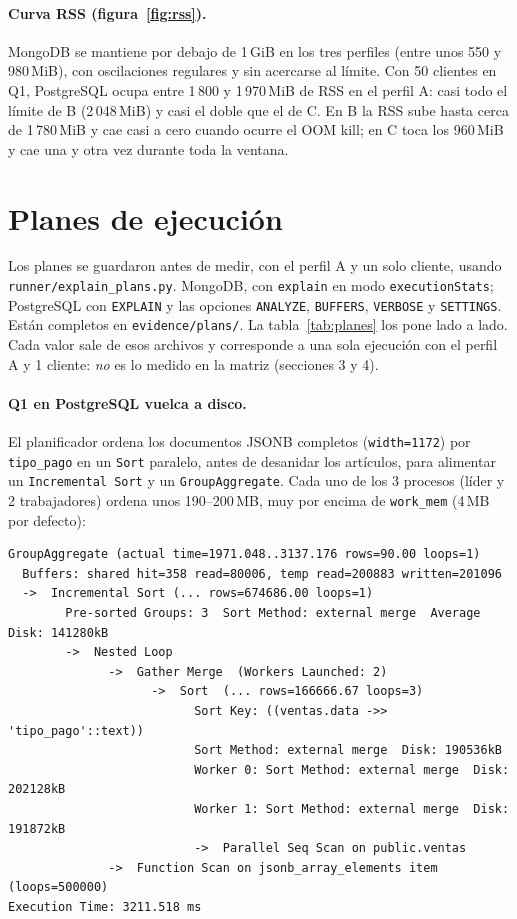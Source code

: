 \documentclass[11pt,a4paper]{article}
\newcommand{\cod}[1]{\texttt{#1}}
\begin{document}
\paragraph{Curva RSS (figura~\ref{fig:rss}).} MongoDB se mantiene por debajo de
1\,GiB en los tres perfiles (entre unos 550 y 980\,MiB), con oscilaciones regulares y sin
acercarse al límite. Con 50 clientes en Q1, PostgreSQL ocupa entre 1\,800 y 1\,970\,MiB
de RSS en el perfil A: casi todo el límite de B (2\,048\,MiB) y casi el doble que el de C. En B la RSS
sube hasta cerca de 1\,780\,MiB y cae casi a cero cuando ocurre el OOM kill; en C toca
los 960\,MiB y cae una y otra vez durante toda la ventana.

\section{Planes de ejecución}\label{sec:planes}
Los planes se guardaron antes de medir, con el perfil A y un solo cliente, usando
\cod{runner/explain\_plans.py}. MongoDB, con \cod{explain} en modo
\cod{executionStats}; PostgreSQL con \cod{EXPLAIN} y las opciones \cod{ANALYZE},
\cod{BUFFERS}, \cod{VERBOSE} y \cod{SETTINGS}.
Están completos en \cod{evidence/plans/}. La tabla~\ref{tab:planes} los pone lado a lado.
Cada valor sale de esos archivos y corresponde a una sola ejecución con el perfil A y 1
cliente: \emph{no} es lo medido en la matriz (secciones 3 y 4).



\paragraph{Q1 en PostgreSQL vuelca a disco.} El planificador ordena los documentos JSONB
completos (\cod{width=1172}) por \cod{tipo\_pago} en un \cod{Sort} paralelo, antes de
desanidar los artículos, para alimentar un \cod{Incremental Sort} y un
\cod{GroupAggregate}. Cada uno de los 3 procesos (líder y 2 trabajadores) ordena
unos 190--200\,MB, muy por encima de \cod{work\_mem} (4\,MB por defecto):

\begin{lstlisting}
GroupAggregate (actual time=1971.048..3137.176 rows=90.00 loops=1)
  Buffers: shared hit=358 read=80006, temp read=200883 written=201096
  ->  Incremental Sort (... rows=674686.00 loops=1)
        Pre-sorted Groups: 3  Sort Method: external merge  Average Disk: 141280kB
        ->  Nested Loop
              ->  Gather Merge  (Workers Launched: 2)
                    ->  Sort  (... rows=166666.67 loops=3)
                          Sort Key: ((ventas.data ->> 'tipo_pago'::text))
                          Sort Method: external merge  Disk: 190536kB
                          Worker 0: Sort Method: external merge  Disk: 202128kB
                          Worker 1: Sort Method: external merge  Disk: 191872kB
                          ->  Parallel Seq Scan on public.ventas
              ->  Function Scan on jsonb_array_elements item (loops=500000)
Execution Time: 3211.518 ms
\end{lstlisting}
\end{document}
